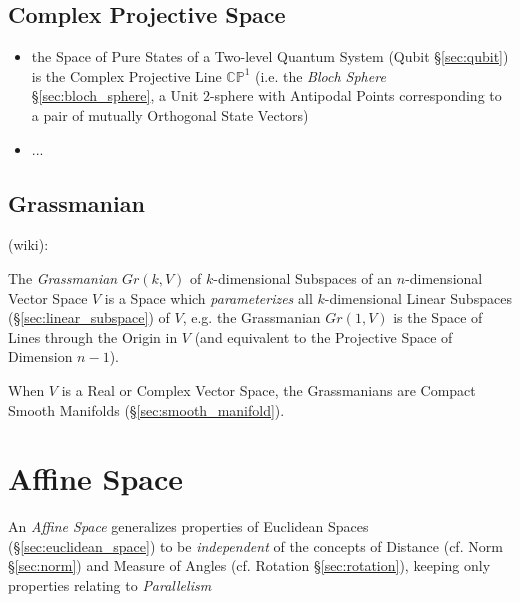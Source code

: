 \subsection{Complex Projective Space}\label{sec:complex_projective_space}

\begin{itemize}
  \item the Space of Pure States of a Two-level Quantum System (Qubit
    \S\ref{sec:qubit}) is the Complex Projective Line $\mathbb{CP}^1$ (i.e. the
    \emph{Bloch Sphere} \S\ref{sec:bloch_sphere}, a Unit $2$-sphere with
    Antipodal Points corresponding to a pair of mutually Orthogonal State
    Vectors)
  \item ...
\end{itemize}



\subsection{Grassmanian}\label{sec:grassmanian}

(wiki):

The \emph{Grassmanian} $Gr(k,V)$ of $k$-dimensional Subspaces of an
$n$-dimensional Vector Space $V$ is a Space which \emph{parameterizes} all
$k$-dimensional Linear Subspaces (\S\ref{sec:linear_subspace}) of $V$, e.g.
the Grassmanian $Gr(1,V)$ is the Space of Lines through the Origin in $V$ (and
equivalent to the Projective Space of Dimension $n-1$).

When $V$ is a Real or Complex Vector Space, the Grassmanians are Compact Smooth
Manifolds (\S\ref{sec:smooth_manifold}).



\section{Affine Space}\label{sec:affine_space}

An \emph{Affine Space} generalizes properties of Euclidean Spaces
(\S\ref{sec:euclidean_space}) to be \emph{independent} of the concepts of
Distance (cf. Norm \S\ref{sec:norm}) and Measure of Angles (cf. Rotation
\S\ref{sec:rotation}), keeping only properties relating to
\emph{Parallelism}

